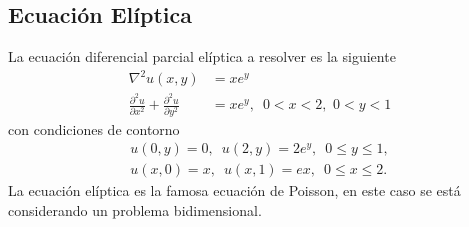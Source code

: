 \documentclass[a4paper]{article}
\begin{document}
\subsection{Ecuación Elíptica}
La ecuación diferencial parcial elíptica a resolver es la siguiente
\begin{equation}\label{eq::elliptic_pde}
\begin{aligned}
\nabla^2 u(x,y)&=x e^y\\
\frac{\partial ^2 u}{\partial x^2}+\frac{\partial ^2 u}{\partial y^2}&=x e^y, \,\,\, 0<x<2,\,\,0<y<1
\end{aligned}
\end{equation}
con condiciones de contorno
\begin{equation}
\begin{aligned}
u(0,y)=0,\,\,\,u(2,y)=2e^y,\,\,\,0\leq y\leq 1,\\
u(x,0)=x,\,\,\,u(x,1)=ex,\,\,\,0\leq x\leq 2.
\end{aligned}
\end{equation}
La ecuación elíptica es la famosa ecuación de Poisson, en este caso se está considerando un problema bidimensional.\\
\end{document}
